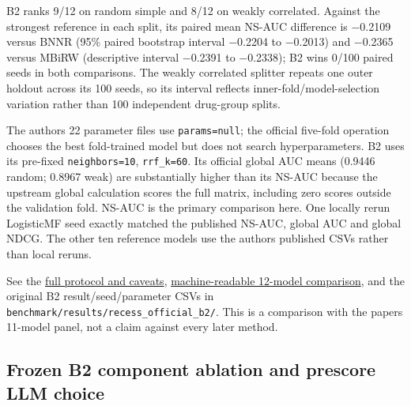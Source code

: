\documentclass[
  10pt,
]{ctexart}
\begin{document}
B2 ranks 9/12 on random simple and 8/12 on weakly correlated. Against
the strongest reference in each split, its paired mean NS-AUC difference
is −0.2109 versus BNNR (95\% paired bootstrap interval −0.2204 to
−0.2013) and −0.2365 versus MBiRW (descriptive interval −0.2391 to
−0.2338); B2 wins 0/100 paired seeds in both comparisons. The weakly
correlated splitter repeats one outer holdout across its 100 seeds, so
its interval reflects inner-fold/model-selection variation rather than
100 independent drug-group splits.

The authors\textquotesingle{} 22 parameter files use
\texttt{params=null}; the official five-fold operation chooses the best
fold-trained model but does not search hyperparameters. B2 uses its
pre-fixed \texttt{neighbors=10}, \texttt{rrf\_\allowbreak{}k=60}. Its official global
AUC means (0.9446 random; 0.8967 weak) are substantially higher than its
NS-AUC because the upstream global calculation scores the full matrix,
including zero scores outside the validation fold. NS-AUC is the primary
comparison here. One locally rerun LogisticMF seed exactly matched the
published NS-AUC, global AUC and global NDCG. The other ten reference
models use the authors\textquotesingle{} published CSVs rather than
local reruns.

See the \href{recess_official_comparison.md}{full protocol and caveats},
\href{../benchmark/results/recess_official_b2_vs_11.json}{machine-readable
12-model comparison}, and the original B2 result/seed/parameter CSVs in
\texttt{benchmark/\allowbreak{}results/\allowbreak{}recess\_\allowbreak{}official\_\allowbreak{}b2/\allowbreak{}}. This is a comparison
with the paper\textquotesingle s 11-model panel, not a claim against
every later method.

\subsection{Frozen B2 component ablation and prescore LLM
choice}\label{frozen-b2-component-ablation-and-prescore-llm-choice}
\end{document}
